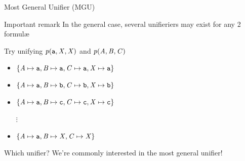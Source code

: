 \documentclass[presentation]{beamer}\mode<presentation>{\usetheme{AMSBolognaFC}}
\begin{document}
\begin{frame}{Most General Unifier (MGU)}

    \begin{alertblock}{Important remark}\centering
        In the general case, \alert{several} unifieriers may exist for any 2 formul\ae{}
    \end{alertblock}
    \begin{exampleblock}{Try unifying $\text{\textit{p}}(\mathtt{a}, \mathit{X}, \mathit{X})$ and $\text{\textit{p}}(\mathit{A}, \mathit{B}, \mathit{C})$}
        \begin{itemize}
            \item $\{ \mathit{A} \mapsto \mathtt{a}, \mathit{B} \mapsto \mathtt{a}, \mathit{C} \mapsto \mathtt{a}, \mathit{X} \mapsto \mathtt{a} \}$
            \item $\{ \mathit{A} \mapsto \mathtt{a}, \mathit{B} \mapsto \mathtt{b}, \mathit{C} \mapsto \mathtt{b}, \mathit{X} \mapsto \mathtt{b} \}$
            \item $\{ \mathit{A} \mapsto \mathtt{a}, \mathit{B} \mapsto \mathtt{c}, \mathit{C} \mapsto \mathtt{c}, \mathit{X} \mapsto \mathtt{c} \}$
            \item[$\vdots$]
            \item \alert{$\{ \mathit{A} \mapsto \mathtt{a}, \mathit{B} \mapsto \mathit{X}, \mathit{C} \mapsto \mathit{X} \}$} 
        \end{itemize}
    \end{exampleblock} 
    \begin{block}{Which unifier?}
        We're commonly interested in the \alert{most general} unifier!
    \end{block}
\end{frame}
\end{document}
